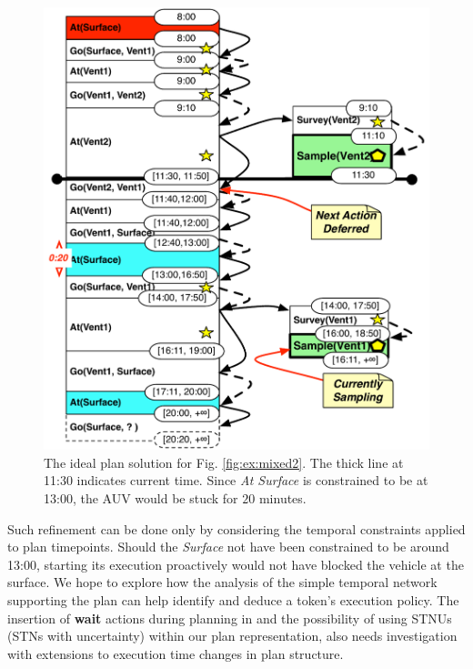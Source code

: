 \begin{figure}[!b]
  \centering
  \includegraphics[width=0.8\columnwidth]{figs/example_ideal}
  \vskip-3mm
  \caption{\small The ideal plan solution for
    Fig. \ref{fig:ex:mixed2}. The thick line at 11:30 indicates
    current time. Since {\em At Surface} is constrained to be at
    13:00, the AUV would be stuck for $20$ minutes.}
  \label{fig:res:ideal}
  \vskip-3mm
\end{figure}
 
Such refinement can be done only by considering the temporal
constraints applied to plan timepoints. Should the {\em Surface} not
have been constrained to be around 13:00, starting its execution
proactively would not have blocked the vehicle at the surface. We hope
to explore how the analysis of the simple temporal network supporting
the plan can help identify and deduce a token's execution policy.  The
insertion of {\bf wait} actions during planning in \cite{morris01} and
the possibility of using STNUs (STNs with uncertainty) within our plan
representation, also needs investigation with extensions to execution
time changes in plan structure.


